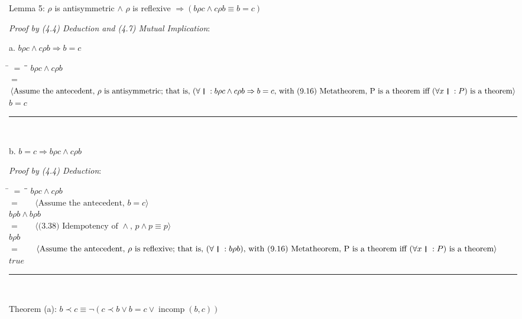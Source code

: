 \documentclass[12pt, fleqn, leqno]{article}
\newcommand{\lgap}{2pt}                             %
\newcommand{\mymathindent}{24pt}                    %
\newcommand{\impl}{\ensuremath{\Rightarrow}}        %
\newcommand{\myqed}{\rule[-.23ex]{1.2ex}{2.0ex}}
\newcommand{\myqedtab}{\hspace{384pt}}              %
\newcommand{\thedr}{\rule[-.25ex]{.32mm}{1.75ex}}   %
\newcommand{\dr}{\;\,\thedr\,\;}                    %
\newcommand{\rb}{:}                                 %
\newcommand{\all}{\forall}                          %
\newcommand{\Gll} {\langle}                         %
\newcommand{\Ggg} {\rangle}                         %
\newcommand{\Hint}[1]     {\ \ \ $\Gll              \mbox{#1} \Ggg$ }   %
\DeclareMathOperator{\incomp}{incomp}
\begin{document}
Lemma 5: $\rho$ is antisymmetric $\land$ $\rho$ is reflexive $\impl (b \rho c \land c \rho b \equiv b = c)$

\textit{Proof by (4.4) Deduction and (4.7) Mutual Implication}:

a. $b \rho c \land c \rho b \impl b = c$
\begin{tabbing}
\hspace{\mymathindent} \= $= \;$ \= \myqedtab \= \kill
	\> \>  $b \rho c \land c \rho b$\\
	\> $=$  \>  \Hint{Assume the antecedent, $\rho$ is antisymmetric; that is, $(\all \dr \rb b \rho c \land c \rho b \impl b = c$, with (9.16) Metatheorem, P is a theorem iff $(\all x \dr \rb P)$ is a theorem}\\[\lgap]
	\> \>   $b = c$ \quad \myqed\\
\end{tabbing}

b. $b = c \impl b \rho c \land c \rho b$

\textit{Proof by (4.4) Deduction}:
\begin{tabbing}
\hspace{\mymathindent} \= $= \;$ \= \myqedtab \= \kill
	\> \>  $b \rho c \land c \rho b$\\
	\> $=$  \>  \Hint{Assume the antecedent, $b = c$}\\[\lgap]
	\> \>   $b \rho b \land b \rho b$\\
	\> $=$  \>  \Hint{(3.38) Idempotency of $\land$, $p \land p \equiv p$}\\[\lgap]
	\> \>   $b \rho b$\\
	\> $=$  \>  \Hint{Assume the antecedent, $\rho$ is reflexive; that is, $(\all \dr \rb b \rho b)$, with (9.16) Metatheorem, P is a theorem iff $(\all x \dr \rb P)$ is a theorem}\\[\lgap]
	\> \>   $true$ \quad \myqed\\
\end{tabbing}

Theorem (a): $b \prec c \equiv \lnot(c \prec b \lor b = c \lor \incomp(b, c))$
\end{document}

